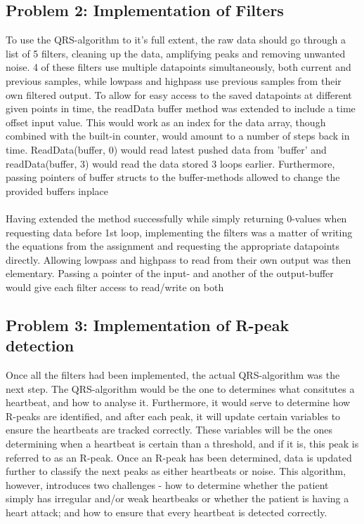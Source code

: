 \documentclass[12pt,a4paper]{article}
\begin{document}
\subsection{Problem 2: Implementation of Filters}
	To use the QRS-algorithm to it's full extent, the raw data should go through a list of 5 filters, cleaning up the data, amplifying peaks and removing unwanted noise. 4 of these filters use multiple datapoints simultaneously, both current and previous samples, while lowpass and highpass use previous samples from their own filtered output. To allow for easy access to the saved datapoints at different given points in time, the readData buffer method was extended to include a time offset input value. This would work as an index for the data array, though combined with the built-in counter, would amount to a number of steps back in time. ReadData(buffer, 0) would read latest pushed data from 'buffer' and readData(buffer, 3) would read the data stored 3 loops earlier. Furthermore, passing pointers of buffer structs to the buffer-methods allowed to change the provided buffers inplace\\
\\	
Having extended the method successfully while simply returning 0-values when requesting data before 1st loop, implementing the filters was a matter of writing the equations from the assignment and requesting the appropriate datapoints directly.
	Allowing lowpass and highpass to read from their own output was then elementary. Passing a pointer of the input- and another of the output-buffer would give each filter access to read/write on both\\

\subsection{Problem 3: Implementation of R-peak detection}
	Once all the filters had been implemented, the actual QRS-algorithm was the next step. The QRS-algorithm would be the one to determines what consitutes a heartbeat, and how to analyse it. Furthermore, it would serve to determine how R-peaks are identified, and after each peak, it will update certain variables to ensure the heartbeats are tracked correctly. These variables will be the ones determining when a heartbeat is certain than a threshold, and if it is, this peak is referred to as an R-peak. Once an R-peak has been determined, data is updated further to classify the next peaks as either heartbeats or noise. This algorithm, however, introduces two challenges - how to determine whether the patient simply has irregular and/or weak heartbeaks or whether the patient is having a heart attack; and how to ensure that every heartbeat is detected correctly.\\
	\\
\end{document}
